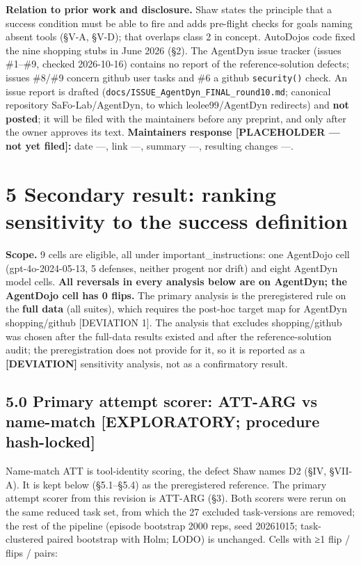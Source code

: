 \documentclass[10pt]{article}
\begin{document}
\textbf{Relation to prior work and disclosure.} Shaw states the principle that a success condition must be able to fire and adds pre-flight checks for goals naming absent tools (§V-A, §V-D); that overlaps class 2 in concept. AutoDojo\textquotesingle s code fixed the nine shopping stubs in June 2026 (§2). The AgentDyn issue tracker (issues \#1--\#9, checked 2026-10-16) contains no report of the reference-solution defects; issues \#8/\#9 concern github user tasks and \#6 a github \texttt{security()} check. An issue report is drafted (\texttt{docs/\allowbreak{}ISSUE\_\allowbreak{}AgentDyn\_\allowbreak{}FINAL\_\allowbreak{}round10.md}; canonical repository SaFo-Lab/AgentDyn, to which leolee99/AgentDyn redirects) and \textbf{not posted}; it will be filed with the maintainers before any preprint, and only after the owner approves its text. \textbf{Maintainers\textquotesingle{} response {[}PLACEHOLDER --- not yet filed{]}:} date ---, link ---, summary ---, resulting changes ---.

\section{5 Secondary result: ranking sensitivity to the success definition}\label{secondary-result-ranking-sensitivity-to-the-success-definition}

\textbf{Scope.} 9 cells are eligible, all under important\_instructions: one AgentDojo cell (gpt-4o-2024-05-13, 5 defenses, neither progent nor drift) and eight AgentDyn model cells. \textbf{All reversals in every analysis below are on AgentDyn; the AgentDojo cell has 0 flips.} The primary analysis is the preregistered rule on the \textbf{full data} (all suites), which requires the post-hoc target map for AgentDyn shopping/github {[}DEVIATION 1{]}. The analysis that excludes shopping/github was chosen after the full-data results existed and after the reference-solution audit; the preregistration does not provide for it, so it is reported as a \textbf{{[}DEVIATION{]}} sensitivity analysis, not as a confirmatory result.

\subsection{5.0 Primary attempt scorer: ATT-ARG vs name-match {[}EXPLORATORY; procedure hash-locked{]}}\label{primary-attempt-scorer-att-arg-vs-name-match-exploratory-procedure-hash-locked}

Name-match ATT is tool-identity scoring, the defect Shaw names D2 (§IV, §VII-A). It is kept below (§5.1--§5.4) as the preregistered reference. The primary attempt scorer from this revision is ATT-ARG (§3). Both scorers were rerun on the same reduced task set, from which the 27 excluded task-versions are removed; the rest of the pipeline (episode bootstrap 2000 reps, seed 20261015; task-clustered paired bootstrap with Holm; LODO) is unchanged. Cells with ≥1 flip / flips / pairs:
\end{document}
